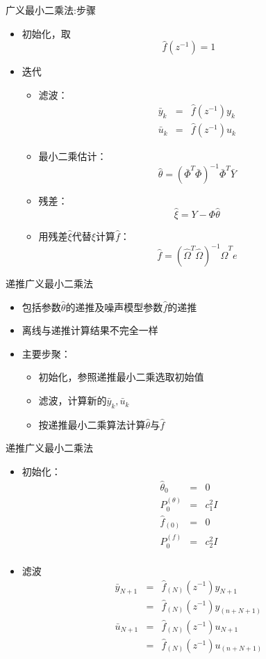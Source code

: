 \begin{frame}{广义最小二乘法:步骤}
\begin{itemize}
\item 初始化，取$$\hat f(z^{-1}) =1$$
\item 迭代
\begin{itemize}
\item 滤波：
\begin{eqnarray*}
\bar y_k &=& \hat f(z^{-1}) y_k \\
\bar u_k &=& \hat f(z^{-1}) u_k
\end{eqnarray*}
\item 最小二乘估计：$$\hat\theta = (\bar\Phi^T\bar\Phi)^{-1}\bar\Phi^T \bar Y  $$
\item 残差：$$\hat\xi = Y-\Phi\hat\theta  $$
\item 用残差$\hat\xi$代替$\xi$计算$\hat f$：$$\hat f = (\hat\Omega^T\hat\Omega)^{-1}\hat\Omega^T e $$
\end{itemize}
\end{itemize}
\end{frame}

\begin{frame}{递推广义最小二乘法}
\begin{itemize}
\item 包括参数$\hat\theta$的递推及噪声模型参数$\hat f$的递推
\item 离线与递推计算结果不完全一样
\item 主要步聚：
\begin{itemize}
\item 初始化，参照递推最小二乘选取初始值
\item 滤波，计算新的$\bar y_k,\bar u_k$
\item 按递推最小二乘算法计算$\hat\theta$与$\hat f$
\end{itemize}
\end{itemize}
\end{frame}

\begin{frame}{递推广义最小二乘法}
\begin{itemize}
\item 初始化：\
\begin{eqnarray*}
\hat\theta_0 &=& 0 \\
P_0^{(\theta)} &=& c_1^2 I \\
\hat f_{(0)} &=& 0 \\
P_0^{(f)} &=& c_2^2 I \\
\end{eqnarray*}
\item 滤波
\begin{eqnarray*}
\bar y_{N+1} &=& \hat f_{(N)}(z^{-1}) y_{N+1} \\
&=& \hat f_{(N)}(z^{-1}) y_{(n+N+1)} \\
\bar u_{N+1} &=& \hat f_{(N)}(z^{-1}) u_{N+1} \\
&=& \hat f_{(N)}(z^{-1}) u_{(n+N+1)} 
\end{eqnarray*}
\end{itemize}
\end{frame}

